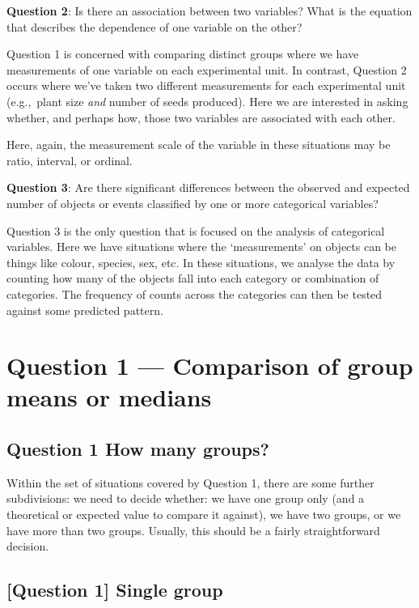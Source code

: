 \documentclass[
]{book}
\begin{document}
\textbf{Question 2}: Is there an association between two variables? What is the equation that describes the dependence of one variable on the other?

Question 1 is concerned with comparing distinct groups where we have measurements of one variable on each experimental unit. In contrast, Question 2 occurs where we've taken two different measurements for each experimental unit (e.g.,~plant size \emph{and} number of seeds produced). Here we are interested in asking whether, and perhaps how, those two variables are associated with each other.

Here, again, the measurement scale of the variable in these situations may be ratio, interval, or ordinal.

\textbf{Question 3}: Are there significant differences between the observed and expected number of objects or events classified by one or more categorical variables?

Question 3 is the only question that is focused on the analysis of categorical variables. Here we have situations where the `measurements' on objects can be things like colour, species, sex, etc. In these situations, we analyse the data by counting how many of the objects fall into each category or combination of categories. The frequency of counts across the categories can then be tested against some predicted pattern.

\hypertarget{qu1}{%
\section{Question 1 --- Comparison of group means or medians}\label{qu1}}

\hypertarget{question-1-how-many-groups}{%
\subsection{Question 1 How many groups?}\label{question-1-how-many-groups}}

Within the set of situations covered by Question 1, there are some further subdivisions: we need to decide whether: we have one group only (and a theoretical or expected value to compare it against), we have two groups, or we have more than two groups. Usually, this should be a fairly straightforward decision.

\hypertarget{question-1-single-group}{%
\subsection{{[}Question 1{]} Single group}\label{question-1-single-group}}
\end{document}
